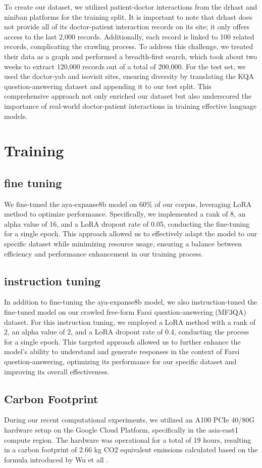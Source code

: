 \documentclass[conference]{IEEEtran}
\begin{document}
To create our dataset, we utilized patient-doctor interactions from the drhast and niniban platforms for the training split. It is important to note that drhast does not provide all of its doctor-patient interaction records on its site; it only offers access to the last 2,000 records. Additionally, each record is linked to 100 related records, complicating the crawling process. To address this challenge, we treated their data as a graph and performed a breadth-first search, which took about two weeks to extract 120,000 records out of a total of 200,000. For the test set, we used the doctor-yab and isovisit sites, ensuring diversity by translating the KQA question-answering dataset
\cite{b10}
and appending it to our test split. This comprehensive approach not only enriched our dataset but also underscored the importance of real-world doctor-patient interactions in training effective language models.

\section{Training}
\subsection{fine tuning}
We fine-tuned the aya-expanse8b model on 60\% of our corpus, leveraging LoRA
\cite{b13}
method to optimize performance. Specifically, we implemented a rank of 8, an alpha value of 16, and a LoRA dropout rate of 0.05, conducting the fine-tuning for a single epoch. This approach allowed us to effectively adapt the model to our specific dataset while minimizing resource usage, ensuring a balance between efficiency and performance enhancement in our training process.
\subsection{instruction tuning}
In addition to fine-tuning the aya-expanse8b model, we also instruction-tuned the fine-tuned model on our crawled free-form Farsi question-answering (MF3QA) dataset. For this instruction tuning, we employed a LoRA method with a rank of 2, an alpha value of 2, and a LoRA dropout rate of 0.4, conducting the process for a single epoch. This targeted approach allowed us to further enhance the model’s ability to understand and generate responses in the context of Farsi question-answering, optimizing its performance for our specific dataset and improving its overall effectiveness.
\subsection{Carbon Footprint}
During our recent computational experiments, we utilized an A100 PCIe 40/80G hardware setup on the Google Cloud Platform, specifically in the asia-east1 compute region. The hardware was operational for a total of 19 hours, resulting in a carbon footprint of 2.66 kg CO2 equivalent emissions calculated  based on the formula introduced by Wu et all
\cite{b14}
.
\end{document}
